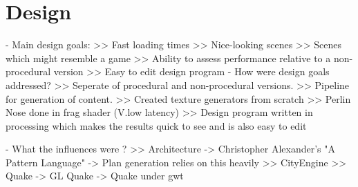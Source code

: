\chapter{Design}
 - Main design goals:   
    >> Fast loading times
    >> Nice-looking scenes
    >> Scenes which might resemble a game
    >> Ability to assess performance relative to a non-procedural version
    >> Easy to edit design program
 - How were design goals addressed?
    >> Seperate of procedural and non-procedural versions.
    >> Pipeline for generation of content.
    >> Created texture generators from scratch
    >> Perlin Nose done in frag shader (V.low latency)
    >> Design program written in processing which makes the results quick to see and is also easy to edit

 - What the influences were ?
    >> Architecture
        -> Christopher Alexander's "A Pattern Language"
        -> Plan generation relies on this heavily
    >> CityEngine
    >> Quake
        -> GL Quake
        -> Quake under gwt
